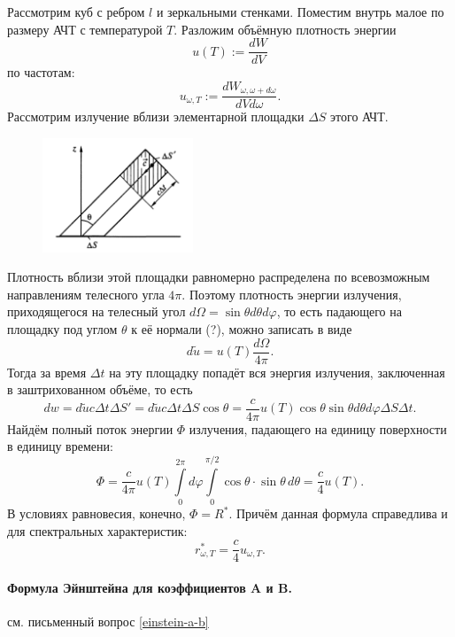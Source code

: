 Рассмотрим куб с ребром $ l $ и зеркальными стенками. Поместим внутрь малое по
размеру АЧТ с температурой $ T $. Разложим объёмную плотность энергии  
\[
    u(T) := \frac{dW}{dV}
\]
по частотам: 
\[
  u_{\omega, T} := \frac{dW_{\omega, \omega + d\omega}}{dVd\omega}.
\]
Рассмотрим излучение вблизи элементарной площадки $ \Delta S $ этого АЧТ.

\begin{figure}[h!]
  \centering
  \includegraphics[width=0.4\textwidth]{img/oral-03/acht.png}
  \label{fig:acht}
\end{figure}

Плотность вблизи этой площадки равномерно распределена по всевозможным
направлениям телесного угла $ 4\pi $. Поэтому плотность энергии излучения,
приходящегося на телесный угол $ d\Omega = \sin \theta d\theta d\varphi $, то
есть падающего на площадку под углом $ \theta $ к её нормали (?), можно записать в
виде
\[
    d\tilde u = u(T) \frac{d\Omega}{4\pi}.
\]
Тогда за время $ \Delta t $ на эту площадку попадёт вся энергия излучения,
заключенная в заштрихованном объёме, то есть 
\[
    dw = d\tilde u c \Delta t \Delta S' = d\tilde u c\Delta t \Delta S \cos
    \theta = \frac{c}{4\pi} u(T)\cos \theta \sin\theta d\theta d\varphi\Delta S
    \Delta t.
\]
Найдём полный поток энергии $ \Phi $ излучения, падающего на единицу поверхности
в единицу времени: 
\[
    \Phi = \frac{c}{4\pi}u(T) \int\limits_{0}^{2\pi}d\varphi
    \int\limits_{0}^{\pi/2}\cos\theta\cdot \sin\theta\,d\theta =
    \frac{c}{4}u(T).
\]
В условиях равновесия, конечно, $ \Phi = R^\ast $. Причём данная формула
справедлива и для спектральных характеристик: 
\[
  r^\ast_{\omega, T} = \frac{c}{4}u_{\omega, T}.
\]


\paragraph{Формула Эйнштейна для коэффициентов A и B.} см. письменный вопрос \ref{einstein-a-b}

